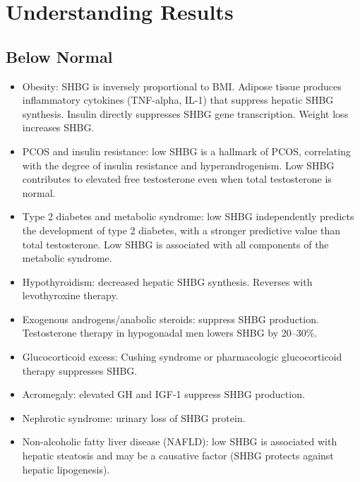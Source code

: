 \section*{Understanding Results}

\subsection*{Below Normal}
\begin{itemize}
  \item Obesity: SHBG is inversely proportional to BMI. Adipose tissue produces inflammatory cytokines (TNF-alpha, IL-1) that suppress hepatic SHBG synthesis. Insulin directly suppresses SHBG gene transcription. Weight loss increases SHBG.
  \item PCOS and insulin resistance: low SHBG is a hallmark of PCOS, correlating with the degree of insulin resistance and hyperandrogenism. Low SHBG contributes to elevated free testosterone even when total testosterone is normal.
  \item Type 2 diabetes and metabolic syndrome: low SHBG independently predicts the development of type 2 diabetes, with a stronger predictive value than total testosterone. Low SHBG is associated with all components of the metabolic syndrome.
  \item Hypothyroidism: decreased hepatic SHBG synthesis. Reverses with levothyroxine therapy.
  \item Exogenous androgens/anabolic steroids: suppress SHBG production. Testosterone therapy in hypogonadal men lowers SHBG by 20--30\%.
  \item Glucocorticoid excess: Cushing syndrome or pharmacologic glucocorticoid therapy suppresses SHBG.
  \item Acromegaly: elevated GH and IGF-1 suppress SHBG production.
  \item Nephrotic syndrome: urinary loss of SHBG protein.
  \item Non-alcoholic fatty liver disease (NAFLD): low SHBG is associated with hepatic steatosis and may be a causative factor (SHBG protects against hepatic lipogenesis).
\end{itemize}

